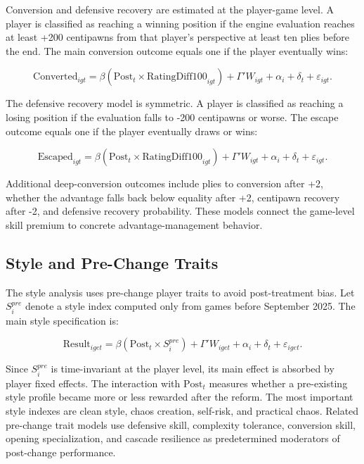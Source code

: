 Conversion and defensive recovery are estimated at the player-game level. A player is classified as reaching a winning position if the engine evaluation reaches at least +200 centipawns from that player's perspective at least ten plies before the end. The main conversion outcome equals one if the player eventually wins:

\begin{equation}
\label{eq:conversion}
\text{Converted}_{igt}
= \beta(\text{Post}_t \times \text{RatingDiff100}_{igt})
+ \Gamma' W_{igt}
+ \alpha_i
+ \delta_t
+ \varepsilon_{igt}.
\end{equation}

The defensive recovery model is symmetric. A player is classified as reaching a losing position if the evaluation falls to -200 centipawns or worse. The escape outcome equals one if the player eventually draws or wins:

\begin{equation}
\label{eq:escape}
\text{Escaped}_{igt}
= \beta(\text{Post}_t \times \text{RatingDiff100}_{igt})
+ \Gamma' W_{igt}
+ \alpha_i
+ \delta_t
+ \varepsilon_{igt}.
\end{equation}

Additional deep-conversion outcomes include plies to conversion after +2, whether the advantage falls back below equality after +2, centipawn recovery after -2, and defensive recovery probability. These models connect the game-level skill premium to concrete advantage-management behavior.

\subsection{Style and Pre-Change Traits}

The style analysis uses pre-change player traits to avoid post-treatment bias. Let \(S_i^{pre}\) denote a style index computed only from games before September 2025. The main style specification is:

\begin{equation}
\label{eq:style}
\text{Result}_{iget}
= \beta(\text{Post}_t \times S_i^{pre})
+ \Gamma' W_{iget}
+ \alpha_i
+ \delta_t
+ \varepsilon_{iget}.
\end{equation}

Since \(S_i^{pre}\) is time-invariant at the player level, its main effect is absorbed by player fixed effects. The interaction with \(\text{Post}_t\) measures whether a pre-existing style profile became more or less rewarded after the reform. The most important style indexes are clean style, chaos creation, self-risk, and practical chaos. Related pre-change trait models use defensive skill, complexity tolerance, conversion skill, opening specialization, and cascade resilience as predetermined moderators of post-change performance.


